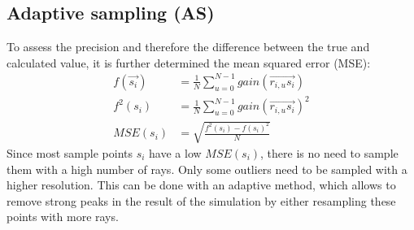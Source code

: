 \subsection{Adaptive sampling (AS)}
\label{subsec:adaptive_sampling}
To assess the precision
and therefore the difference between the true and calculated value,
it is further determined the mean squared error (MSE):
\begin{align}
     f(\vec{s_i}) &= \frac{1}{N} \sum_{u=0}^{N-1} gain(\overrightarrow{r_{i,u}s_i})\\
     f^2(s_i)     &= \frac{1}{N} \sum_{u=0}^{N-1} gain(\overrightarrow{r_{i,u}s_i})^2\\
     MSE(s_i)     &= \sqrt{\frac{f^2(s_i) - f(s_i)^2}{N}}
\end{align}
Since most sample points $s_i$ have a low $MSE(s_i)$, there is no need
to sample them with a high number of rays. Only some outliers need to
be sampled with a higher resolution. This can be done with an adaptive
method, which allows to remove strong peaks in the result
of the simulation by either resampling these points with more rays.

